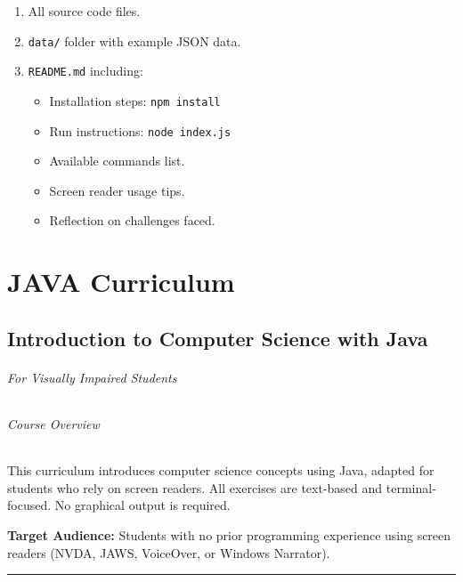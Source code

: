 \documentclass[
  justified,
  openright,
]{tufte-book}
\let\subsection\paragraph
\let\paragraph\paragraph
\let\subsection\paragraph
\let\paragraph\paragraph
\providecommand{\tightlist}{%
  \setlength{\itemsep}{0pt}\setlength{\parskip}{0pt}}
\begin{document}
\begin{enumerate}
\def\labelenumi{\arabic{enumi}.}
\tightlist
\item
  All source code files.
\item
  \texttt{data/} folder with example JSON data.
\item
  \texttt{README.md} including:

  \begin{itemize}
  \tightlist
  \item
    Installation steps: \texttt{npm\ install}
  \item
    Run instructions: \texttt{node\ index.js}
  \item
    Available commands list.
  \item
    Screen reader usage tips.
  \item
    Reflection on challenges faced.
  \end{itemize}
\end{enumerate}

\cleardoublepage

\part{JAVA Curriculum}

\FloatBarrier\chapter*{Introduction to Computer Science with Java}

\subsection{For Visually Impaired
Students}\label{for-visually-impaired-students-1}

\subsection{Course Overview}\label{course-overview-1}

This curriculum introduces computer science concepts using Java, adapted
for students who rely on screen readers. All exercises are text-based
and terminal-focused. No graphical output is required.

\textbf{Target Audience:} Students with no prior programming experience
using screen readers (NVDA, JAWS, VoiceOver, or Windows Narrator).

\begin{center}\rule{0.5\linewidth}{0.5pt}\end{center}
\end{document}
